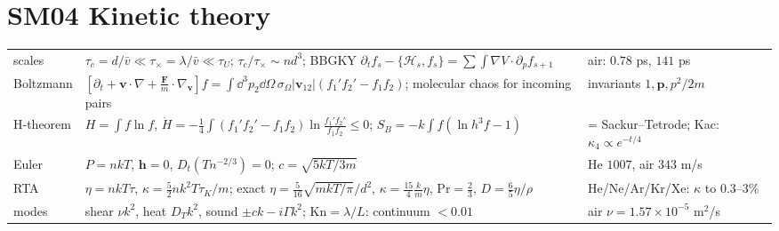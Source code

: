 \documentclass[9pt]{article}
\begin{document}
\section*{SM04 Kinetic theory}
\begin{tabular}{@{}p{2.9cm}p{8.9cm}p{5.6cm}@{}}
\toprule
scales & $\tau_c=d/\bar v\ll\tau_\times=\lambda/\bar v\ll\tau_U$; $\tau_c/\tau_\times\sim nd^3$; BBGKY $\partial_tf_s-\{\mathcal H_s,f_s\}=\sum\int\nabla V\cdot\partial_pf_{s+1}$ & air: $0.78$ ps, $141$ ps\\
Boltzmann & $[\partial_t+\mathbf v\!\cdot\!\nabla+\tfrac{\mathbf F}m\!\cdot\!\nabla_{\mathbf v}]f=\int\dd^3p_2\dd\Omega\,\sigma_\Omega|\mathbf v_{12}|(f_1'f_2'-f_1f_2)$; molecular chaos for incoming pairs & invariants $1,\mathbf p,p^2/2m$\\
H-theorem & $H=\int f\ln f$, $\dot H=-\tfrac14\int(f_1'f_2'-f_1f_2)\ln\tfrac{f_1'f_2'}{f_1f_2}\le0$; $S_B=-k\int f(\ln h^3f-1)$ & = Sackur--Tetrode; Kac: $\kappa_4\propto e^{-t/4}$\\
Euler & $P=nkT$, $\mathbf h=0$, $D_t(Tn^{-2/3})=0$; $c=\sqrt{5kT/3m}$ & He $1007$, air $343$ m/s\\
RTA & $\eta=nkT\tau$, $\kappa=\tfrac52nk^2T\tau_K/m$; exact $\eta=\tfrac5{16}\sqrt{mkT/\pi}/d^2$, $\kappa=\tfrac{15}4\tfrac km\eta$, $\mathrm{Pr}=\tfrac23$, $D=\tfrac65\eta/\rho$ & He/Ne/Ar/Kr/Xe: $\kappa$ to $0.3$--$3\%$\\
modes & shear $\nu k^2$, heat $D_Tk^2$, sound $\pm ck-i\Gamma k^2$; $\mathrm{Kn}=\lambda/L$: continuum $<0.01$ & air $\nu=1.57\times10^{-5}$ m$^2$/s\\
\bottomrule
\end{tabular}
\end{document}
